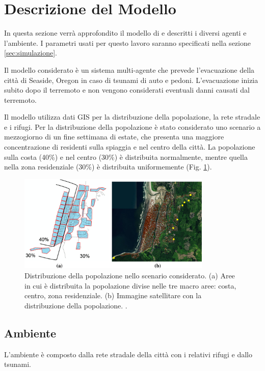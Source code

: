 \section{Descrizione del Modello}
\label{sec:modello}
In questa sezione verrà approfondito il modello di \textcite{wang2016agent} e descritti i diversi agenti e l'ambiente.
I parametri usati per questo lavoro saranno specificati nella sezione \ref{sec:simulazione}.

Il modello considerato è un sistema multi-agente che prevede l'evacuazione della città di Seaside, Oregon in caso di tsunami di auto e pedoni.
%
L'evacuazione inizia subito dopo il terremoto e non vengono considerati eventuali danni causati dal terremoto.

\pagebreak

Il modello utilizza dati GIS per la distribuzione della popolazione, la rete stradale e i rifugi.
%
Per la distribuzione della popolazione è stato considerato uno scenario a mezzogiorno di un fine settimana di estate,
che presenta una maggiore concentrazione di residenti sulla spiaggia e nel centro della città.
La popolazione sulla costa (40\%) e nel centro (30\%) è distribuita normalmente,
mentre quella nella zona residenziale (30\%) è distribuita uniformemente (Fig. \ref{fig:population}).

\begin{figure}[ht]
  \centering
  \includegraphics[width=0.82\textwidth]{images/population}
  \caption{Distribuzione della popolazione nello scenario considerato.
    (a) Aree in cui è distribuita la popolazione divise nelle tre macro aree: costa, centro, zona residenziale.
    (b) Immagine satellitare con la distribuzione della popolazione.
    \parencite{mostafizi2017agent}.}
  \label{fig:population}
\end{figure}

\subsection{Ambiente}
L'ambiente è composto dalla rete stradale della città con i relativi rifugi e dallo tsunami.

